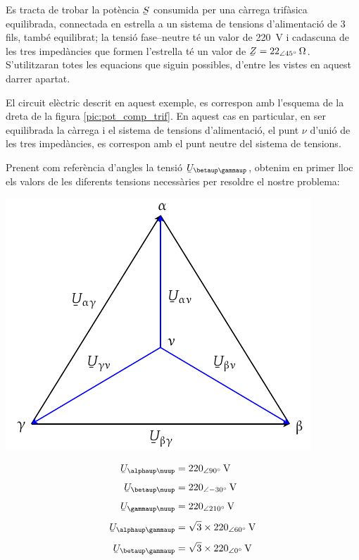 \begin{exemple}
    Es tracta de trobar la pot\`{e}ncia $\cmplx{S}$ consumida per una c\`{a}rrega
    trif\`{a}sica equilibrada, connectada en estrella a un sistema de tensions
    d'alimentaci\'{o}  de 3 fils, tamb\'{e} equilibrat; la tensi\'{o} fase--neutre
    t\'{e} un valor de \SI{220}{V} i cadascuna de les tres  imped\`{a}ncies
    que formen l'estrella t\'{e} un valor de $\cmplx{Z}=\SIpd{22}{45}{\ohm}$.
     S'utilitzaran totes les equacions que
    siguin possibles, d'entre les vistes en aquest darrer apartat.

    El circuit el\`{e}ctric descrit en aquest exemple, es correspon amb
    l'esquema de la dreta de la figura \vref{pic:pot_comp_trif}. En
    aquest cas en particular, en ser equilibrada la c\`{a}rrega i el
    sistema de tensions d'alimentaci\'{o}, el punt $\nu$ d'uni\'{o} de  les tres imped\`{a}ncies, es
    correspon amb el punt neutre del sistema de tensions.

    Prenent com refer\`{e}ncia d'angles la tensi\'{o}
    $\cmplx{U}_{\betaup\gammaup}$, obtenim en primer lloc els valors de
    les diferents tensions necess\`{a}ries per resoldre el nostre
    problema:

    \hfill
    \begin{minipage}[b]{7.5cm}
        \includegraphics{Imatges/Cap-Fonaments-Potencia-Exemple.pdf}
    \end{minipage}
    \hfill
    \begin{minipage}[b][5.7cm][t]{3.8cm}
    \begin{align*}
        \cmplx{U}_{\alphaup\nuup} &= \SIpd{220}{90}{V} \\[1ex]
        \cmplx{U}_{\betaup\nuup} &= \SIpd{220}{-30}{V} \\[1ex]
        \cmplx{U}_{\gammaup\nuup} &= \SIpd{220}{210}{V} \\[1ex]
        \cmplx{U}_{\alphaup\gammaup} &= \sqrt{3}\times \SIpd{220}{60}{V} \\[1ex]
        \cmplx{U}_{\betaup\gammaup} &= \sqrt{3}\times \SIpd{220}{0}{V}
    \end{align*}
    \end{minipage}
    \hfill{}


\end{exemple}
